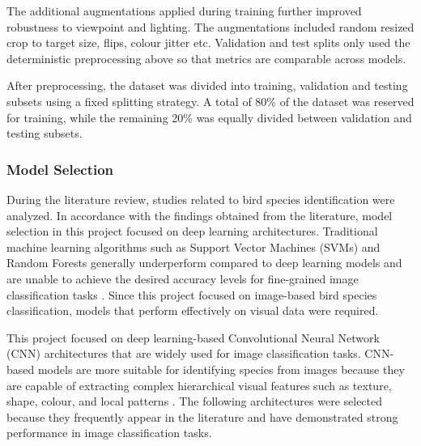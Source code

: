 The additional augmentations applied during training further improved robustness to viewpoint and lighting.
The augmentations included random resized crop to target size, flips, colour jitter etc.
Validation and test splits only used the deterministic preprocessing above so that metrics are comparable across models.

After preprocessing, the dataset was divided into training, validation and testing subsets using a fixed splitting strategy.
A total of 80\% of the dataset was reserved for training, while the remaining 20\% was equally divided between validation and testing subsets.

\subsubsection{Model Selection}

During the literature review, studies related to bird species identification were
analyzed. In accordance with the findings obtained from the literature, model
selection in this project focused on deep learning architectures. Traditional
machine learning algorithms such as Support Vector Machines (SVMs) and Random
Forests generally underperform compared to deep learning models and are unable to
achieve the desired accuracy levels for fine-grained image classification tasks
\cite{lolge2025evolution}. Since this project focused on image-based bird species
classification, models that perform effectively on visual data were required.

This project focused on deep learning-based Convolutional Neural Network (CNN)
architectures that are widely used for image classification tasks. CNN-based
models are more suitable for identifying species from images because they are
capable of extracting complex hierarchical visual features such as texture,
shape, colour, and local patterns \cite{chen2024fetfgvc}. The following architectures
were selected because they frequently appear in the literature and have
demonstrated strong performance in image classification tasks.

